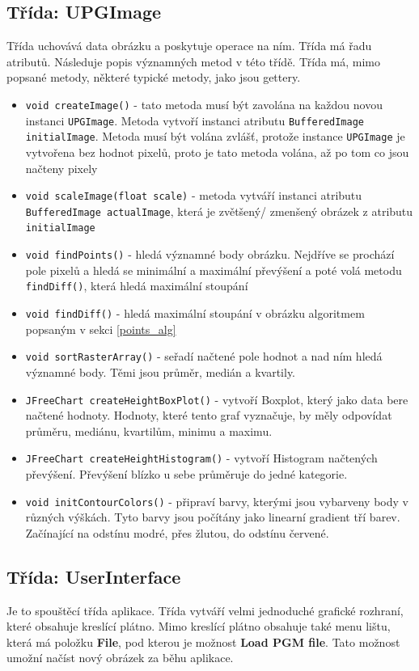\documentclass[12pt]{report}
\begin{document}
\subsection{Třída: UPGImage}
Třída uchovává data obrázku a poskytuje operace na ním. Třída má řadu atributů.
Následuje popis významných metod v této třídě. 
Třída má, mimo popsané metody, některé typické metody, jako jsou gettery.

\begin{itemize}
  \item \texttt{void createImage()} - tato metoda musí být zavolána na každou novou instanci \texttt{UPGImage}.
	Metoda vytvoří instanci atributu \texttt{BufferedImage initialImage}. Metoda musí být volána zvlášť,
	protože instance \texttt{UPGImage} je vytvořena bez hodnot pixelů, proto je tato metoda volána, až po
	tom co jsou načteny pixely
  \item \texttt{void scaleImage(float scale)} - metoda vytváří instanci atributu \texttt{BufferedImage actualImage},
  	která je zvětšený/ zmenšený obrázek z atributu \texttt{initialImage}
  \item \texttt{void findPoints()} - hledá významné body obrázku. Nejdříve se prochází pole pixelů a hledá se
  	minimální a maximální převýšení a poté volá metodu \texttt{findDiff()}, která hledá maximální stoupání
  \item \texttt{void findDiff()} - hledá maximální stoupání v obrázku algoritmem popsaným v sekci \ref{points_alg}
  \item \texttt{void sortRasterArray()} - seřadí načtené pole hodnot a nad ním hledá významné body. Těmi jsou
  	průměr, medián a kvartily.
  \item \texttt{JFreeChart createHeightBoxPlot()} - vytvoří Boxplot, který jako data bere načtené hodnoty. 
  	Hodnoty, které tento graf vyznačuje, by měly odpovídat průměru, mediánu, kvartilům, minimu a maximu.
  \item \texttt{JFreeChart createHeightHistogram()} - vytvoří Histogram načtených převýšení. Převýšení 
  	blízko u sebe průměruje do jedné kategorie.
  \item \texttt{void initContourColors()} - připraví barvy, kterými jsou vybarveny body v různých výškách.
  	Tyto barvy jsou počítány jako linearní gradient tří barev. Začínající na odstínu modré, přes žlutou,
	do odstínu červené.
\end{itemize}
%
\subsection{Třída: UserInterface}
Je to spouštěcí třída aplikace. Třída vytváří velmi jednoduché grafické rozhraní, které obsahuje kreslící plátno.
Mimo kreslící plátno obsahuje také menu lištu, která má položku \textbf{File}, pod kterou je možnost
\textbf{Load PGM file}. Tato možnost umožní načíst nový obrázek za běhu aplikace.
\end{document}
